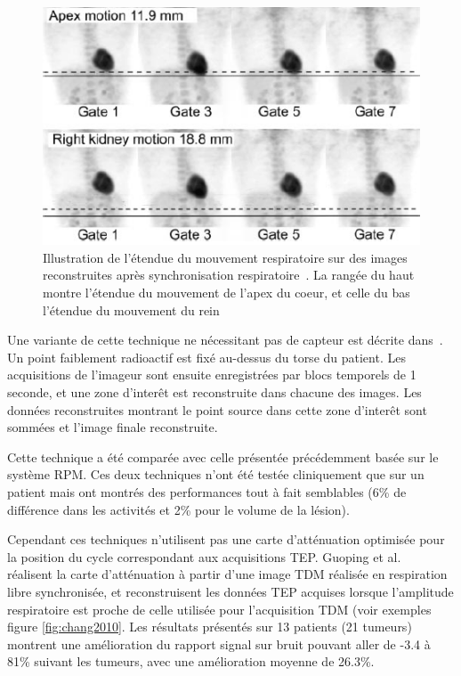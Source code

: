 \begin{figure}[h!]
	\begin{center}
		\includegraphics[width=12cm]{images/gatingBoucher2004}
	\end{center}
	\caption{Illustration de l'étendue du mouvement respiratoire sur des images reconstruites après synchronisation respiratoire~\cite{boucher2004respiratory}. La rangée du haut montre l'étendue du mouvement de l'apex du coeur, et celle du bas l'étendue du mouvement du rein} 
	\label{fig:boucher2004}
\end{figure}

Une variante de cette technique ne nécessitant pas de capteur est décrite dans~\cite{nehmeh2003reduction}. Un point faiblement radioactif est fixé au-dessus du torse du patient. Les acquisitions de l'imageur sont ensuite enregistrées par blocs temporels de 1 seconde, et une zone d'interêt est reconstruite dans chacune des images. Les données reconstruites montrant le point source dans cette zone d'interêt sont sommées et l'image finale reconstruite. 

Cette technique a été comparée avec celle présentée précédemment basée sur le système RPM. Ces deux techniques n'ont été testée cliniquement que sur un patient mais ont montrés des performances tout à fait semblables (6\% de différence dans les activités et 2\% pour le volume de la lésion).

Cependant ces techniques n'utilisent pas une carte d'atténuation optimisée pour la position du cycle correspondant aux acquisitions TEP.  Guoping et al.~\cite{GuopingChang2010Implementation} réalisent la carte d'atténuation à partir d'une image TDM réalisée en respiration libre synchronisée, et reconstruisent les données TEP acquises lorsque l'amplitude respiratoire est proche de celle utilisée pour l'acquisition TDM (voir exemples figure \ref{fig:chang2010}. Les résultats présentés sur 13 patients (21 tumeurs) montrent une amélioration du rapport signal sur bruit pouvant aller de -3.4 à 81\% suivant les tumeurs, avec une amélioration moyenne de 26.3\%.

